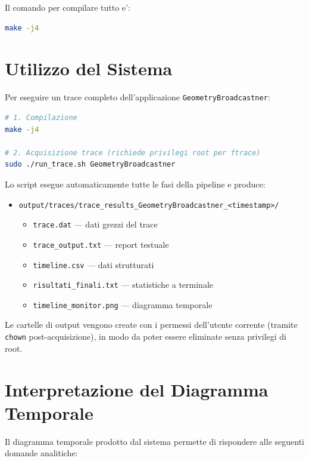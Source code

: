 Il comando per compilare tutto e':
\begin{lstlisting}[language=bash]
make -j4
\end{lstlisting}


\section{Utilizzo del Sistema}
\label{sec:utilizzo}

Per eseguire un trace completo dell'applicazione \texttt{GeometryBroadcastner}:

\begin{lstlisting}[language=bash]
# 1. Compilazione
make -j4

# 2. Acquisizione trace (richiede privilegi root per ftrace)
sudo ./run_trace.sh GeometryBroadcastner
\end{lstlisting}

Lo script esegue automaticamente tutte le fasi della pipeline e produce:
\begin{itemize}
    \item \texttt{output/traces/trace\_results\_GeometryBroadcastner\_<timestamp>/}
    \begin{itemize}
        \item \texttt{trace.dat} --- dati grezzi del trace
        \item \texttt{trace\_output.txt} --- report testuale
        \item \texttt{timeline.csv} --- dati strutturati
        \item \texttt{risultati\_finali.txt} --- statistiche a terminale
        \item \texttt{timeline\_monitor.png} --- diagramma temporale
    \end{itemize}
\end{itemize}

Le cartelle di output vengono create con i permessi dell'utente corrente
(tramite \texttt{chown} post-acquisizione), in modo da poter essere
eliminate senza privilegi di root.


\section{Interpretazione del Diagramma Temporale}
\label{sec:interpretazione}

Il diagramma temporale prodotto dal sistema permette di rispondere
alle seguenti domande analitiche:

